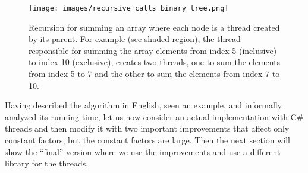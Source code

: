 \documentclass[10pt]{article}
\begin{document}
\begin{figure}
\begin{center}
\texttt{[image: images/recursive\_calls\_binary\_tree.png]}
\end{center}
\caption{Recursion for summing an array where each node is a thread
  created by its parent.  For example (see shaded region), the thread
  responsible for summing the array elements from index 5 (inclusive)
  to index 10 (exclusive), creates two threads, one to sum the
  elements from index 5 to 7 and the other to sum the elements from
  index 7 to 10.}
\label{fig:recursive_calls_binary_tree}
\end{figure}

Having described the algorithm in English, seen an example, and
informally analyzed its running time, let us now consider an actual
implementation with C\# threads and then modify it with two important
improvements that affect only constant factors, but the constant
factors are large.  Then the next section will show the ``final''
version where we use the improvements and use a different library for
the threads.
\end{document}
